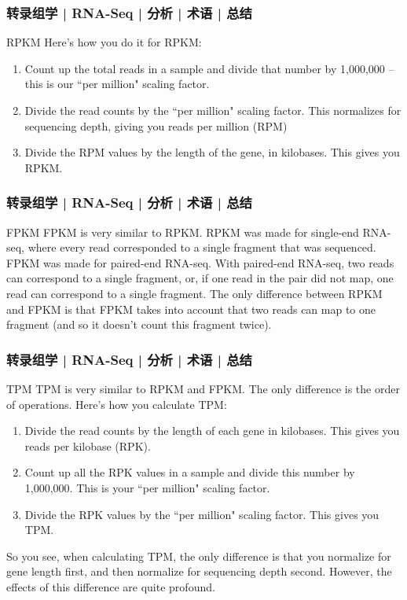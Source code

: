 \begin{frame}
  \frametitle{转录组学 | RNA-Seq | 分析 | 术语 | 总结}
  \begin{block}{RPKM}
    Here's how you do it for RPKM:
    \begin{enumerate}
      \item Count up the total reads in a sample and divide that number by 1,000,000 – this is our ``per million" scaling factor.
      \item Divide the read counts by the ``per million" scaling factor. This normalizes for sequencing depth, giving you reads per million (RPM)
      \item Divide the RPM values by the length of the gene, in kilobases. This gives you RPKM.
    \end{enumerate}
  \end{block}
\end{frame}

\begin{frame}
  \frametitle{转录组学 | RNA-Seq | 分析 | 术语 | 总结}
  \begin{block}{FPKM}
 FPKM is very similar to RPKM. RPKM was made for single-end RNA-seq, where every read corresponded to a single fragment that was sequenced. FPKM was made for paired-end RNA-seq. With paired-end RNA-seq, two reads can correspond to a single fragment, or, if one read in the pair did not map, one read can correspond to a single fragment. The only difference between RPKM and FPKM is that FPKM takes into account that two reads can map to one fragment (and so it doesn't count this fragment twice). 
  \end{block}
\end{frame}

\begin{frame}
  \frametitle{转录组学 | RNA-Seq | 分析 | 术语 | 总结}
  \begin{block}{TPM}
    TPM is very similar to RPKM and FPKM. The only difference is the order of operations. Here's how you calculate TPM:
    \begin{enumerate}
      \item Divide the read counts by the length of each gene in kilobases. This gives you reads per kilobase (RPK).
      \item Count up all the RPK values in a sample and divide this number by 1,000,000. This is your ``per million" scaling factor.
      \item Divide the RPK values by the ``per million" scaling factor. This gives you TPM.
    \end{enumerate}
    So you see, when calculating TPM, the only difference is that you normalize for gene length first, and then normalize for sequencing depth second. However, the effects of this difference are quite profound.
  \end{block}
\end{frame}

